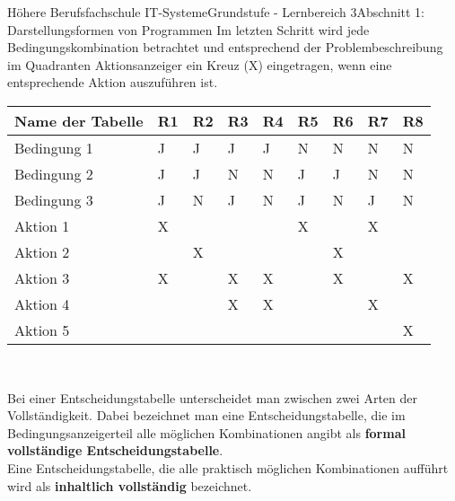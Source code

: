 \documentclass[11pt,oneside,openany,headings=optiontotoc,11pt,numbers=noenddot]{article}
\begin{document}
\begin{worksheet}{Höhere Berufsfachschule IT-Systeme}{Grundstufe - Lernbereich 3}{Abschnitt 1: Darstellungsformen von Programmen}
		Im letzten Schritt wird jede Bedingungskombination betrachtet und entsprechend der Problembeschreibung im Quadranten \grqq{}Aktionsanzeiger\grqq{} ein Kreuz (X) eingetragen, wenn eine entsprechende Aktion auszuführen ist.\\
		\par\noindent
		\begin{tabularx}{\textwidth}{|l||M|M|M|M|M|M|M|M|}
			\hline
			\textbf{Name der Tabelle} & \textbf{R1} & \textbf{R2} & \textbf{R3} & \textbf{R4} & \textbf{R5} & \textbf{R6} & \textbf{R7} & \textbf{R8}\\
			\hline
			Bedingung 1 & J & J & J & J & N & N & N & N\\
			\hline
			Bedingung 2 & J & J & N & N & J & J & N & N\\
			\hline
			Bedingung 3 & J & N & J & N & J & N & J & N\\
			\hline
			\hline
			Aktion 1 & X & & & & X & & X & \\
			\hline
			Aktion 2 & & X & & & & X & & \\
			\hline
			Aktion 3 & X & & X & X & & X & & X\\
			\hline
			Aktion 4 & & & X & X & & & X & \\
			\hline
			Aktion 5 & & & & & & & & X\\
			\hline
		\end{tabularx}\\
		\par\noindent
		Bei einer Entscheidungstabelle unterscheidet man zwischen zwei Arten der Vollständigkeit. Dabei bezeichnet man eine Entscheidungstabelle, die im Bedingungsanzeigerteil alle möglichen Kombinationen angibt als \textbf{formal vollständige Entscheidungstabelle}.\\
		Eine Entscheidungstabelle, die alle praktisch möglichen Kombinationen aufführt wird als \textbf{inhaltlich vollständig} bezeichnet.\\

\end{worksheet}
\end{document}
